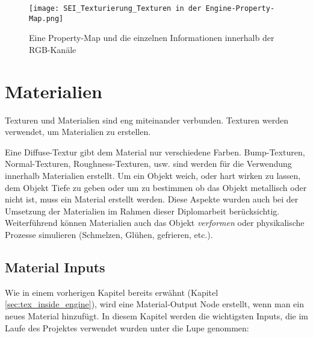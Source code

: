 \begin{figure}[h]
    \centering
    \texttt{[image: SEI\_Texturierung\_Texturen in der Engine-Property-Map.png]}
    \caption{Eine Property-Map und die einzelnen Informationen innerhalb der RGB-Kanäle}
    \label{picture:property_map}
\end{figure}


\section{Materialien}
\label{sec:materials}

Texturen und Materialien sind eng miteinander verbunden. Texturen werden verwendet, um Materialien zu erstellen.

Eine Diffuse-Textur gibt dem Material nur verschiedene Farben. Bump-Texturen, Normal-Texturen, Roughness-Texturen, usw.
sind werden für die Verwendung innerhalb Materialien erstellt. Um ein Objekt weich, oder hart wirken zu lassen, dem
Objekt Tiefe zu geben oder um zu bestimmen ob das Objekt metallisch oder nicht ist, muss ein Material erstellt werden.
Diese Aspekte wurden auch bei der Umsetzung der Materialien im Rahmen dieser Diplomarbeit berücksichtig. Weiterführend
können Materialien auch das Objekt \textit{verformen} oder physikalische Prozesse simulieren (Schmelzen, Glühen,
gefrieren, etc.).

\subsection{Material Inputs}
\label{sec:mat_inputs}

Wie in einem vorherigen Kapitel bereits erwähnt (Kapitel \ref{sec:tex_inside_engine}), wird eine Material-Output Node
erstellt, wenn man ein neues Material hinzufügt. In diesem Kapitel werden die wichtigsten Inputs, die im Laufe des
Projektes verwendet wurden unter die Lupe genommen:

